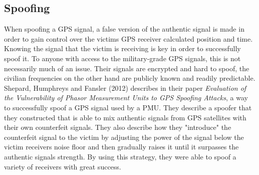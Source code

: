 \documentclass[12pt,english,a4paper]{article}
\begin{document}
\subsection{Spoofing}
When spoofing a GPS signal, a false version of the authentic signal is made in order to gain control over the victims GPS receiver calculated position and time. Knowing the signal that the victim is receiving is key in order to successfully spoof it. To anyone with access to the military-grade GPS signals, this is not necessarily much of an issue. Their signals are encrypted and hard to spoof, the civilian frequencies on the other hand are publicly known and readily predictable. Shepard, Humphreys and Fansler (2012)\cite{EVPMUGA} describes in their paper \textit{Evaluation of the Vulnerability of Phasor Measurement Units to GPS Spoofing Attacks}, a way to successfully spoof a GPS signal used by a PMU. They describe a spoofer that they constructed that is able to mix authentic signals from GPS satellites with their own counterfeit signals. They also describe how they "introduce" the counterfeit signal to the victim by adjusting the power of the signal below the victim receivers noise floor and then gradually raises it until it surpasses the authentic signals strength. By using this strategy, they were able to spoof a variety of receivers with great success. 
\newpage
\printbibliography[title={Complete Bibliography},heading=bibintoc]
\end{document}
